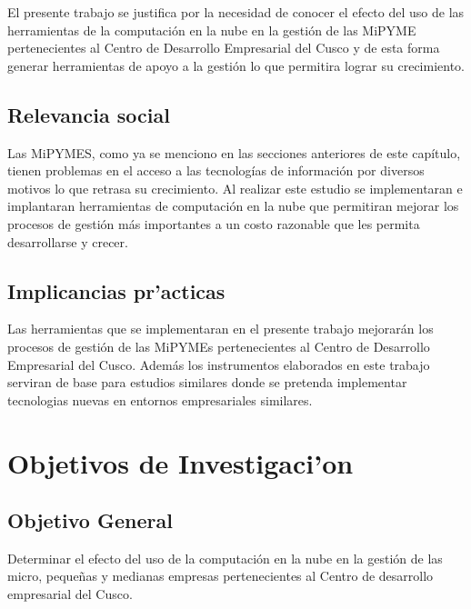 El presente trabajo se justifica por la necesidad de conocer el efecto del uso
de las herramientas de la computaci\'on en la nube en la gesti\'on de las MiPYME
pertenecientes al Centro de Desarrollo Empresarial del Cusco y de esta forma
generar herramientas de apoyo a la gesti\'on lo que permitira lograr su crecimiento.


\subsection{Relevancia social}
Las MiPYMES, como ya se menciono en las secciones anteriores de este cap\'itulo,
tienen problemas en el acceso a las tecnolog\'ias de informaci\'on por diversos motivos
lo que retrasa su crecimiento. Al realizar este estudio se implementaran e implantaran
herramientas de computaci\'on en la nube que permitiran mejorar los procesos de gesti\'on
m\'as importantes a un costo razonable que les permita desarrollarse y crecer.

\subsection{Implicancias pr'acticas}
Las herramientas que se implementaran en el presente trabajo mejorar\'an los procesos
de gesti\'on de las MiPYMEs pertenecientes al Centro de Desarrollo Empresarial del Cusco.
Adem\'as los instrumentos elaborados en este trabajo serviran de base para estudios
similares donde se pretenda implementar tecnologias nuevas en entornos empresariales
similares.


\section{Objetivos de Investigaci'on}
\subsection{Objetivo General}
Determinar el efecto del uso de la computaci\'on en la nube en la gesti\'on de
las micro, peque\~nas y medianas empresas pertenecientes al Centro de desarrollo
empresarial del Cusco.
